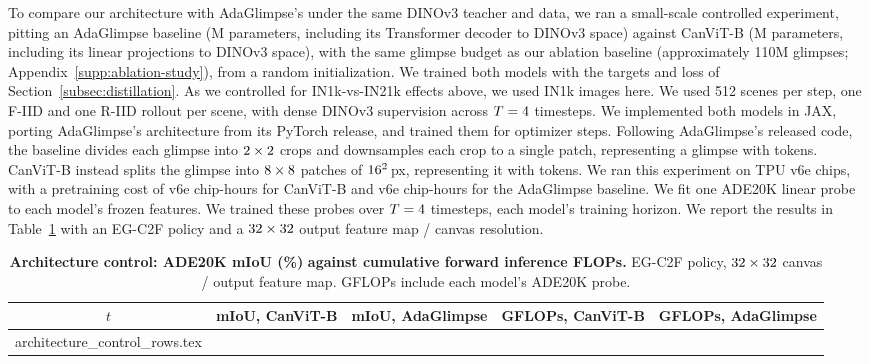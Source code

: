 \documentclass{article}
\makeatletter
\newcommand{\inputrows}[1]{\@@input #1 }
\makeatother
\begin{document}
To compare our architecture with AdaGlimpse's under the same DINOv3 teacher and data, we ran a small-scale controlled experiment, pitting an AdaGlimpse baseline (\ctrlParamsBaseline{}M parameters, including its Transformer decoder to DINOv3 space) against CanViT-B (\ctrlParamsCanvit{}M parameters, including its linear projections to DINOv3 space), with the same glimpse budget as our ablation baseline (approximately 110M glimpses; Appendix~\ref{supp:ablation-study}), from a random initialization.
We trained both models with the targets and loss of Section~\ref{subsec:distillation}.
As we controlled for IN1k-vs-IN21k effects above, we used IN1k images here.
We used 512 scenes per step, one \mbox{F-IID} and one \mbox{R-IID} rollout per scene, with dense DINOv3 supervision across $T = 4$ timesteps.
We implemented both models in JAX, porting AdaGlimpse's architecture from its PyTorch release, and trained them for \ctrlPretrainSteps{} optimizer steps.
Following AdaGlimpse's released code, the baseline divides each glimpse into $2 \times 2$ crops and downsamples each crop to a single patch, representing a glimpse with \ctrlBaselineTokens{} tokens.
CanViT-B instead splits the glimpse into $8 \times 8$ patches of $16^2$\,px, representing it with \ctrlCanvitTokens{} tokens.
We ran this experiment on TPU v6e chips, with a pretraining cost of \ctrlChipHoursCanvit{} v6e chip-hours for CanViT-B and \ctrlChipHoursBaseline{} v6e chip-hours for the AdaGlimpse baseline.
We fit one ADE20K linear probe to each model's frozen features.
We trained these probes over $T = 4$ timesteps, each model's training horizon.
We report the results in Table~\ref{tab:architecture-control} with an EG-C2F policy and a $32 \times 32$ output feature map / canvas resolution.

\begin{table}[h]
  \caption{\textbf{Architecture control: ADE20K mIoU (\%)} \textbf{against cumulative forward inference FLOPs.}
  EG-C2F policy, $32 \times 32$ canvas / output feature map. GFLOPs include each model's ADE20K probe.}
  \label{tab:architecture-control}
  \centering
  \small
  \begin{tabular}{ccccc}
    \toprule
    $t$ & \textbf{mIoU, CanViT-B} & \textbf{mIoU, AdaGlimpse} & \textbf{GFLOPs, CanViT-B} & \textbf{GFLOPs, AdaGlimpse} \\
    \midrule
    \inputrows{architecture_control_rows.tex}
    \bottomrule
  \end{tabular}
\end{table}
\end{document}
